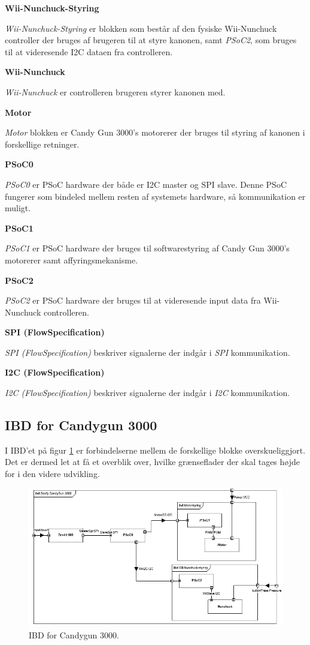 \textbf{Wii-Nunchuck-Styring}

\textit{Wii-Nunchuck-Styring} er blokken som består af den fysiske Wii-Nunchuck controller der bruges af brugeren til at styre kanonen, samt \textit{PSoC2}, som bruges til at videresende I2C dataen fra controlleren.

\textbf{Wii-Nunchuck}

\textit{Wii-Nunchuck} er controlleren brugeren styrer kanonen med.

\textbf{Motor}

\textit{Motor} blokken er Candy Gun 3000's motorerer der bruges til styring af kanonen i forskellige retninger.

\textbf{PSoC0}

\textit{PSoC0} er PSoC hardware der både er I2C master og SPI slave. Denne PSoC fungerer som bindeled mellem resten af systemets hardware, så kommunikation er muligt.

\textbf{PSoC1}

\textit{PSoC1} er PSoC hardware der bruges til softwarestyring af Candy Gun 3000's motorerer samt affyringsmekanisme.

\textbf{PSoC2}

\textit{PSoC2} er PSoC hardware der bruges til at videresende input data fra Wii-Nunchuck controlleren.	

\textbf{SPI (FlowSpecification)}

\textit{SPI (FlowSpecification)} beskriver signalerne der indgår i \textit{SPI} kommunikation.

\textbf{I2C (FlowSpecification)}

\textit{I2C (FlowSpecification)} beskriver signalerne der indgår i \textit{I2C} kommunikation.
\subsection{IBD for Candygun 3000}
I IBD'et på figur \ref{fig:IBD} er forbindelserne mellem de forskellige blokke overskueliggjort. Det er dermed let at få et overblik over, hvilke grænseflader der skal tages højde for i den videre udvikling. 

\begin{figure}[H]
	\centering
	\includegraphics[width=\textwidth]{Systemarkitektur/images/GoofycandygunIBD.png}
	\caption{IBD for Candygun 3000.}
	\label{fig:IBD}
\end{figure}

